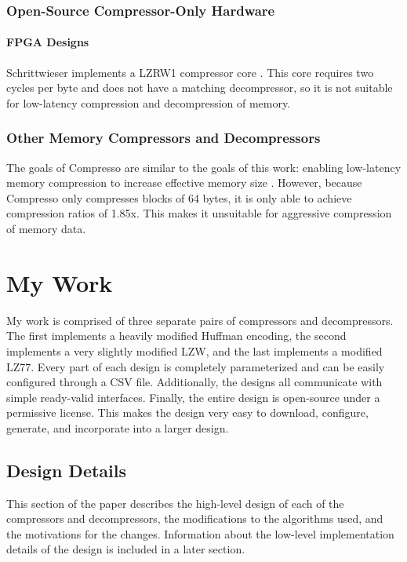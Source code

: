 \documentclass[doublespace,nopageskip]{VTthesis}
\begin{document}
\subsection{Open-Source Compressor-Only Hardware}\label{ss:open-source_compressor-only_hardware}
\subsubsection{FPGA Designs}\label{sss:fpga_designs}
Schrittwieser implements a LZRW1 compressor core \cite{lzrw1}. This core requires two cycles per byte and does not have a matching decompressor, so it is not suitable for low-latency compression and decompression of memory.

\subsection{Other Memory Compressors and Decompressors}\label{ss:other_memory_compressors_and_decompressors}
The goals of Compresso are similar to the goals of this work: enabling low-latency memory compression to increase effective memory size \cite{compresso}. However, because Compresso only compresses blocks of 64 bytes, it is only able to achieve compression ratios of 1.85x. This makes it unsuitable for aggressive compression of memory data.

\chapter{My Work} \label{ch:my_work}
My work is comprised of three separate pairs of compressors and decompressors. The first implements a heavily modified Huffman encoding, the second implements a very slightly modified LZW, and the last implements a modified LZ77. Every part of each design is completely parameterized and can be easily configured through a CSV file. Additionally, the designs all communicate with simple ready-valid interfaces. Finally, the entire design is open-source under a permissive license. This makes the design very easy to download, configure, generate, and incorporate into a larger design.

\section{Design Details}\label{se:design_details}
This section of the paper describes the high-level design of each of the compressors and decompressors, the modifications to the algorithms used, and the motivations for the changes. Information about the low-level implementation details of the design is included in a later section.
\end{document}
